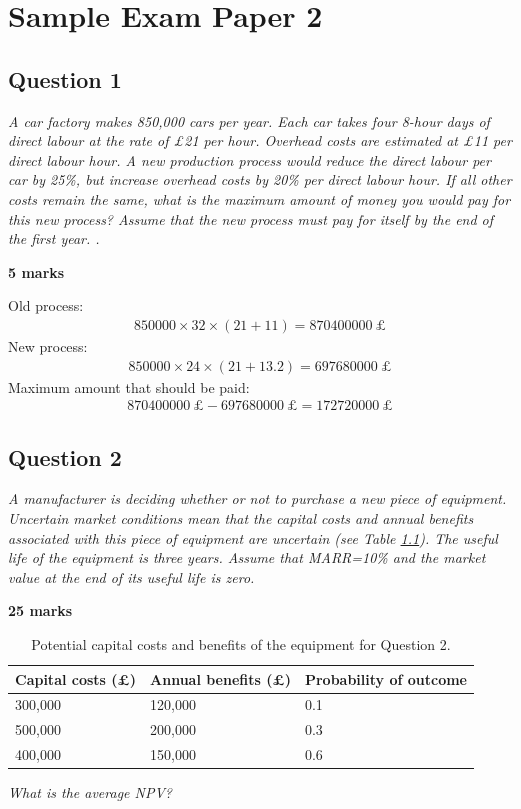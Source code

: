 \chapter{Sample Exam Paper 2}
\section{Question 1}
\textit{A car factory makes 850,000 cars per year. Each car takes four 8-hour days of direct labour at the rate of \pounds 21 per hour. Overhead costs are estimated at \pounds 11 per direct labour hour. A new production process would reduce the direct labour per car by 25\%, but increase overhead costs by 20\% per direct labour hour. If all other costs remain the same, what is the maximum amount of money you would pay for this new process? Assume that the new process must pay for itself by the end of the first year. .}

\textbf{5 marks}

Old process:
\begin{gather}
    850000\times 32\times \left(21+11\right) = \SI{870400000}{\pounds}
\end{gather}
New process:
\begin{gather}
    850000\times 24 \times \left(21+13.2\right) = \SI{697680000}{\pounds}
\end{gather}
Maximum amount that should be paid:
\begin{gather}
    \SI{870400000}{\pounds} - \SI{697680000}{\pounds} = \SI{172720000}{\pounds}
\end{gather}
\section{Question 2}
\textit{A manufacturer is deciding whether or not to purchase a new piece of equipment. Uncertain market conditions mean that the capital costs and annual benefits associated with this piece of equipment are uncertain (see Table \ref{tab:capCostsQ2}). The useful life of the equipment is three years. Assume that MARR=10\% and the market value at the end of its useful life is zero. }

\textbf{25 marks}

\begin{table}[H]
    \centering
    \begin{tabular}{@{}lll@{}}
        \toprule
        \textbf{Capital costs (\pounds)} & \textbf{Annual benefits (\pounds)} & \textbf{Probability of outcome} \\
        \midrule
        300,000                          & 120,000                            & 0.1                             \\
        500,000                          & 200,000                            & 0.3                             \\
        400,000                          & 150,000                            & 0.6                             \\
        \bottomrule
    \end{tabular}
    \caption{Potential capital costs and benefits of the equipment for Question 2.}
    \label{tab:capCostsQ2}
\end{table}
\textit{What is the average NPV?}

